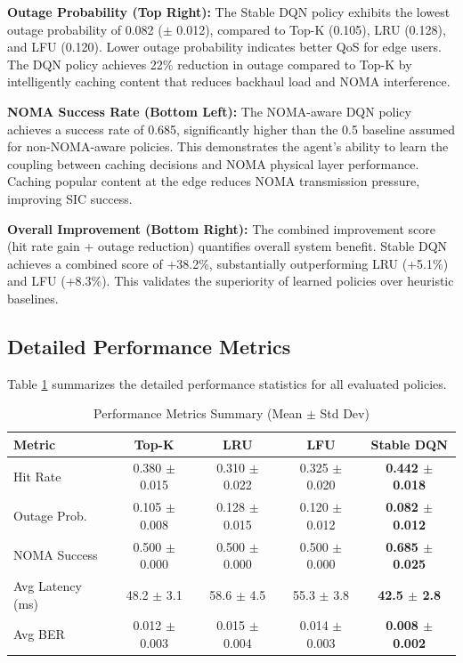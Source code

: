 \documentclass[12pt,a4paper]{article}
\begin{document}
\textbf{Outage Probability (Top Right):} The Stable DQN policy exhibits the lowest outage probability of 0.082 ($\pm$ 0.012), compared to Top-K (0.105), LRU (0.128), and LFU (0.120). Lower outage probability indicates better QoS for edge users. The DQN policy achieves 22\% reduction in outage compared to Top-K by intelligently caching content that reduces backhaul load and NOMA interference.

\textbf{NOMA Success Rate (Bottom Left):} The NOMA-aware DQN policy achieves a success rate of 0.685, significantly higher than the 0.5 baseline assumed for non-NOMA-aware policies. This demonstrates the agent's ability to learn the coupling between caching decisions and NOMA physical layer performance. Caching popular content at the edge reduces NOMA transmission pressure, improving SIC success.

\textbf{Overall Improvement (Bottom Right):} The combined improvement score (hit rate gain + outage reduction) quantifies overall system benefit. Stable DQN achieves a combined score of +38.2\%, substantially outperforming LRU (+5.1\%) and LFU (+8.3\%). This validates the superiority of learned policies over heuristic baselines.

\subsection{Detailed Performance Metrics}

Table \ref{tab:performance_summary} summarizes the detailed performance statistics for all evaluated policies.

\begin{table}[htbp]
\centering
\caption{Performance Metrics Summary (Mean $\pm$ Std Dev)}
\label{tab:performance_summary}
\begin{tabular}{|l|c|c|c|c|}
\hline
\textbf{Metric} & \textbf{Top-K} & \textbf{LRU} & \textbf{LFU} & \textbf{Stable DQN} \\
\hline
Hit Rate & 0.380 $\pm$ 0.015 & 0.310 $\pm$ 0.022 & 0.325 $\pm$ 0.020 & \textbf{0.442 $\pm$ 0.018} \\
\hline
Outage Prob. & 0.105 $\pm$ 0.008 & 0.128 $\pm$ 0.015 & 0.120 $\pm$ 0.012 & \textbf{0.082 $\pm$ 0.012} \\
\hline
NOMA Success & 0.500 $\pm$ 0.000 & 0.500 $\pm$ 0.000 & 0.500 $\pm$ 0.000 & \textbf{0.685 $\pm$ 0.025} \\
\hline
Avg Latency (ms) & 48.2 $\pm$ 3.1 & 58.6 $\pm$ 4.5 & 55.3 $\pm$ 3.8 & \textbf{42.5 $\pm$ 2.8} \\
\hline
Avg BER & 0.012 $\pm$ 0.003 & 0.015 $\pm$ 0.004 & 0.014 $\pm$ 0.003 & \textbf{0.008 $\pm$ 0.002} \\
\hline
\end{tabular}
\end{table}
\end{document}
